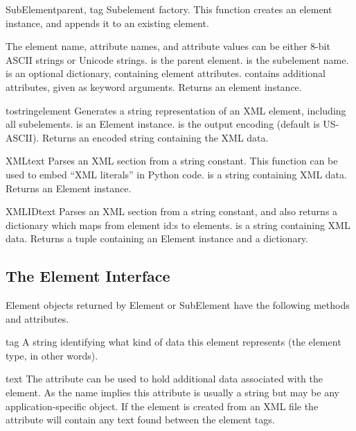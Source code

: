\begin{funcdesc}{SubElement}{parent, tag}
Subelement factory.  This function creates an element instance, and
appends it to an existing element.

The element name, attribute names, and attribute values can be
either 8-bit ASCII strings or Unicode strings.
 is the parent element.
 is the subelement name.
 is an optional dictionary, containing element attributes.
 contains additional attributes, given as keyword arguments.
Returns an element instance.
\end{funcdesc}

\begin{funcdesc}{tostring}{element}
Generates a string representation of an XML element, including all
subelements.
 is an Element instance.
 is the output encoding (default is US-ASCII).
Returns an encoded string containing the XML data.
\end{funcdesc}

\begin{funcdesc}{XML}{text}
Parses an XML section from a string constant.  This function can
be used to embed ``XML literals'' in Python code.
 is a string containing XML data.
Returns an Element instance.
\end{funcdesc}

\begin{funcdesc}{XMLID}{text}
Parses an XML section from a string constant, and also returns
a dictionary which maps from element id:s to elements.
 is a string containing XML data.
Returns a tuple containing an Element instance and a dictionary.
\end{funcdesc}


\subsection{The Element Interface\label{elementtree-element-interface}}

Element objects returned by Element or SubElement have the 
following methods and attributes.

\begin{memberdesc}[Element]{tag}
A string identifying what kind of data this element represents
(the element type, in other words).
\end{memberdesc}

\begin{memberdesc}[Element]{text}
The  attribute can be used to hold additional data
associated with the element.
As the name implies this attribute is usually a string but may be any
application-specific object.
If the element is created from an XML file the attribute will contain
any text found between the element tags.
\end{memberdesc}

